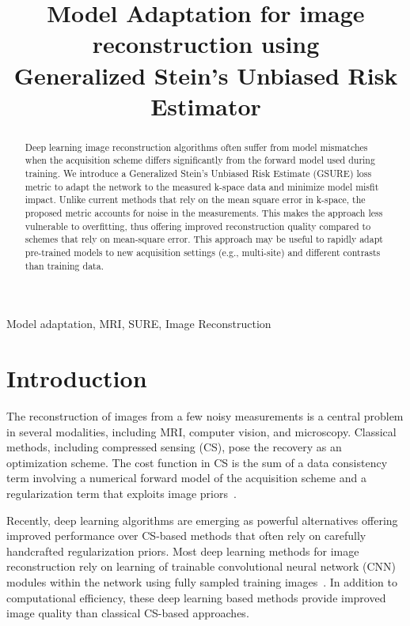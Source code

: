 \documentclass{article}
\title{Model Adaptation for image reconstruction using \\Generalized Stein's Unbiased Risk Estimator}
\begin{document}
%
\maketitle
%
\begin{abstract}

Deep learning image reconstruction algorithms often suffer from model mismatches when the acquisition scheme differs significantly from the forward model used during training. We introduce a Generalized Stein's Unbiased Risk Estimate (GSURE) loss metric to adapt the network to the measured k-space data and minimize model misfit impact. Unlike current methods that rely on the mean square error in k-space, the proposed metric accounts for noise in the measurements. This makes the approach less vulnerable to overfitting, thus offering improved reconstruction quality compared to schemes that rely on mean-square error. This approach may be useful to rapidly adapt pre-trained models to new acquisition settings (e.g., multi-site) and different contrasts than training data.

\end{abstract}
%
\begin{keywords}
 Model adaptation, MRI, SURE, Image Reconstruction 
\end{keywords}
%
\section{Introduction}

The reconstruction of images from a few noisy measurements is a central problem in several modalities, including MRI, computer vision, and microscopy. Classical methods, including compressed sensing (CS), pose the recovery as an optimization scheme. The cost function in CS is the sum of a data consistency term involving a numerical forward model of the acquisition scheme and a regularization term that exploits image priors~\cite{lustig2008compressed,candes2007sparsity}. 

Recently, deep learning algorithms are emerging as powerful alternatives offering improved performance over CS-based methods that often rely on carefully handcrafted regularization priors. Most deep learning methods for image reconstruction rely on learning of trainable convolutional neural network (CNN) modules within the network using fully sampled training images~\cite{modl,casecadeDynamic,jongCT}. In addition to computational efficiency, these deep learning based methods provide improved image quality than classical CS-based approaches.
\end{document}
